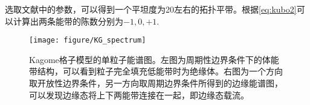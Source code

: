 选取文献\cite{Liu2012a}中的参数，可以得到一个平坦度为20左右的拓扑平带。根据\eqref{eq:kubo2}可以计算出两条能带的陈数分别为$-1,0,+1$.
\begin{figure}[h]
  \centering
  \texttt{[image: figure/KG\_spectrum]}
\caption{Kagome格子模型的单粒子能谱图。左图为周期性边界条件下的体能带结构，可以看到粒子完全填充低能带时为绝缘体。右图为一个方向取开放性边界条件，另一方向取周期边界条件所得到的边缘能谱图，可以发现边缘态将上下两能带连接在一起，即边缘态载流。}
\label{fig:kg_spectrum}
\end{figure}


